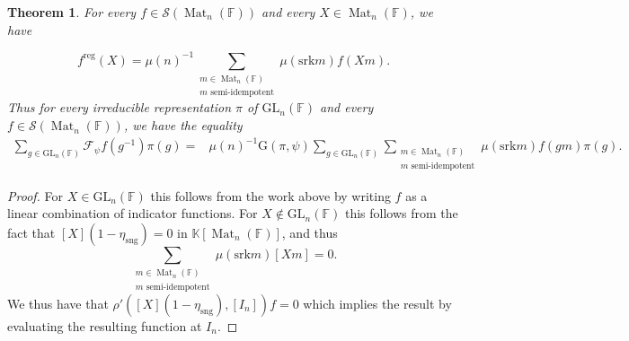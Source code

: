 \documentclass[12pt, reqno]{amsart}
\newtheorem{theorem}{Theorem}[section]
\theoremstyle{definition}
\newcommand{\coefficientsField}{\mathbb{K}}
\newcommand{\fieldCharacter}{\psi}
\newcommand{\IdentityMatrix}[1]{I_{#1}}
\newcommand{\GL}{\mathrm{GL}}
\newcommand{\finiteField}{\mathbb{F}}
\newcommand{\squareMatrix}{\operatorname{Mat}}
\newcommand{\fourierTransform}[1]{\mathcal{F}_{#1}}
\newcommand{\GaussSumScalar}[2]{\mathrm{G}\left(#1, #2\right)}
\newcommand{\srank}{\mathrm{srk}}
\newcommand{\Schwartz}{\mathcal{S}}
\newcommand{\regular}{\mathrm{reg}}
\newcommand{\singular}{\mathrm{sng}}
\begin{document}
	\begin{theorem}\label{thm:godement-jacquet-for-arbitrary-functions}
		For every $f \in \Schwartz\left(\squareMatrix_n\left(\finiteField\right)\right)$ and every $X \in \squareMatrix_n\left(\finiteField\right)$, we have
		
		\begin{displaymath}
		f^{\regular}\left(X\right) = \mu\left(n\right)^{-1} \sum_{\substack{m \in \squareMatrix_n\left(\finiteField\right)\\
	m \text{ semi-idempotent}}} \mu\left(\srank m\right) f\left(Xm\right).
	\end{displaymath}
	Thus for every irreducible representation $\pi$ of $\GL_n\left(\finiteField\right)$ and every $f \in \Schwartz\left(\squareMatrix_n\left(\finiteField\right)\right)$, we have the equality
	\begin{equation*}
		\begin{split}
			\sum_{g \in \GL_n\left(\finiteField\right)} \fourierTransform{\fieldCharacter}f\left(g^{-1}\right) \pi\left(g\right) =& \mu\left(n\right)^{-1} \GaussSumScalar{\pi}{\fieldCharacter} \sum_{g \in \GL_n\left(\finiteField\right)} \sum_{\substack{m \in \squareMatrix_n\left(\finiteField\right)\\
					m \text{ semi-idempotent}}} \mu\left(\srank m\right) f\left(gm\right) \pi\left(g\right).
		\end{split}
	\end{equation*}
	\end{theorem}
	\begin{proof}
		For $X \in \GL_n\left(\finiteField\right)$ this follows from the work above by writing $f$ as a linear combination of indicator functions. For $X \notin \GL_n\left(\finiteField\right)$ this follows from the fact that $\left[X\right]\left(1-\eta_{\singular}\right) = 0$ in $\coefficientsField\left[\squareMatrix_n\left(\finiteField\right)\right]$, and thus
		\begin{displaymath}
			\sum_{\substack{m \in \squareMatrix_n\left(\finiteField\right)\\
					m \text{ semi-idempotent}}} \mu\left(\srank m\right) \left[Xm\right] = 0.
		\end{displaymath}
		We thus have that $\rho'\left(\left[X\right]\left(1 - \eta_{\singular}\right), \left[\IdentityMatrix{n}\right]\right) f = 0$ which implies the result by evaluating the resulting function at $\IdentityMatrix{n}$.
	\end{proof}
	
\end{document}
